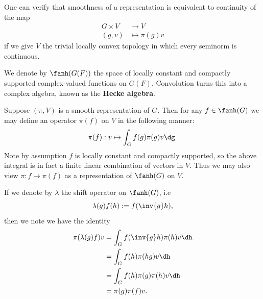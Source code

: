 \documentclass[11pt, x11names, openany]{book}
\begin{document}
\begin{remark}
One can verify that smoothness of a representation is equivalent to continuity of the map
\begin{align*}
G \times V &\to V\\
(g, v) &\mapsto \pi(g) v
\end{align*}
if we give $V$ the trivial locally convex topology in which every seminorm is continuous. 
\end{remark}



\begin{defn}
  \label{def: hecke algebra}
We denote by $\fanh(G(F))$ the space of locally constant and compactly supported complex-valued functions on $G(F)$. Convolution turns this into a complex algebra, known as the \textbf{Hecke algebra}. 
\end{defn}


Suppose $(\pi, V)$ is a smooth representation of $G$. Then for any $f \in \fanh(G)$ we may define an operator $\pi(f)$ on $V$ in the following manner:
\begin{equation}
  \label{eqn: repn of H(G)}
  \pi(f) : v \mapsto \int_G f(g) \pi(g) v \dg.
\end{equation}
Note by assumption $f$ is locally constant and compactly supported, so the above integral is in fact a finite linear combination of vectors in $V$. Thus we may also view $\pi : f \mapsto \pi(f)$ as a representation of $\fanh(G)$ on $V$.

If we denote by $\lambda$ the shift operator on $\fanh(G)$, i.e 
\begin{equation*}
  \lambda(g)f (h) := f( \inv{g}h),
\end{equation*}
then we note we have the identity
\begin{align*}
  \pi (\lambda(g)f) v &= \int_G f(\inv{g}h) \pi(h)v \dh\\
  &= \int_G f(h) \pi(hg) v \dh\\
  &= \int_G f(h) \pi(g) \pi(h) v \dh\\
  &= \pi(g)\pi(f) v.
\end{align*}
\end{document}
